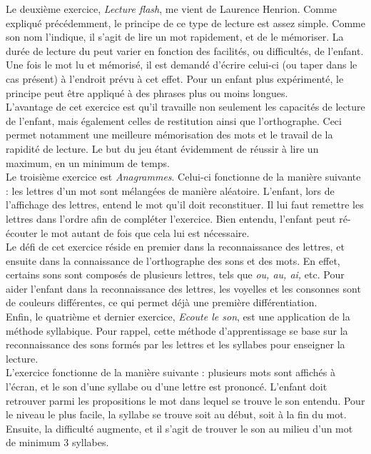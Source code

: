 Le deuxième exercice, \textit{Lecture flash}, me vient de Laurence Henrion. Comme expliqué précédemment, le principe de ce type de lecture est assez simple. Comme son nom l'indique, il s'agit de lire un mot rapidement, et de le mémoriser. La durée de lecture du peut varier en fonction des facilités, ou difficultés, de l'enfant. Une fois le mot lu et mémorisé, il est demandé d'écrire celui-ci (ou taper dans le cas présent) à l'endroit prévu à cet effet. Pour un enfant plus expérimenté, le principe peut être appliqué à des phrases plus ou moins longues.\\

L'avantage de cet exercice est qu'il travaille non seulement les capacités de lecture de l'enfant, mais également celles de restitution ainsi que l'orthographe. Ceci permet notamment une meilleure mémorisation des mots et le travail de la rapidité de lecture. Le but du jeu étant évidemment de réussir à lire un maximum, en un minimum de temps. \\

Le troisième exercice est \textit{Anagrammes}. Celui-ci fonctionne de la manière suivante : les lettres d'un mot sont mélangées de manière aléatoire. L'enfant, lors de l'affichage des lettres, entend le mot qu'il doit reconstituer. Il lui faut remettre les lettres dans l'ordre afin de compléter l'exercice. Bien entendu, l'enfant peut ré-écouter le mot autant de fois que cela lui est nécessaire.\\

Le défi de cet exercice réside en premier dans la reconnaissance des lettres, et ensuite dans la connaissance de l'orthographe des sons et des mots. En effet, certains sons sont composés de plusieurs lettres, tels que \textit{ou, au, ai,} etc. Pour aider l'enfant dans la reconnaissance des lettres, les voyelles et les consonnes sont de couleurs différentes, ce qui permet déjà une première différentiation.\\

Enfin, le quatrième et dernier exercice, \textit{Ecoute le son}, est une application de la méthode syllabique. Pour rappel, cette méthode d'apprentissage se base sur la reconnaissance des sons formés par les lettres et les syllabes pour enseigner la lecture.\\

L'exercice fonctionne de la manière suivante : plusieurs mots sont affichés à l'écran, et le son d'une syllabe ou d'une lettre est prononcé. L'enfant doit retrouver parmi les propositions le mot dans lequel se trouve le son entendu. Pour le niveau le plus facile, la syllabe se trouve soit au début, soit à la fin du mot. Ensuite, la difficulté augmente, et il s'agit de trouver le son au milieu d'un mot de minimum 3 syllabes.\\

